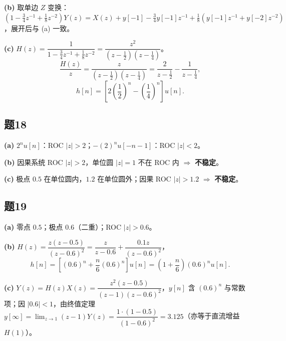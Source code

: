 \documentclass[11pt,a4paper]{ctexart}
\begin{document}
\textbf{(b)} 取单边 $Z$ 变换：$(1-\frac{3}{4}z^{-1}+\frac{1}{8}z^{-2})Y(z)=X(z)+y[-1]-\frac{3}{4}y[-1]z^{-1}+\frac{1}{8}(y[-1]z^{-1}+y[-2]z^{-2})$，展开后与 (a) 一致。

\textbf{(c)} $H(z)=\dfrac{1}{1-\frac{3}{4}z^{-1}+\frac{1}{8}z^{-2}}=\dfrac{z^2}{(z-\frac{1}{2})(z-\frac{1}{4})}$。
\[
\frac{H(z)}{z}=\frac{z}{(z-\frac{1}{2})(z-\frac{1}{4})}=\frac{2}{z-\frac{1}{2}}-\frac{1}{z-\frac{1}{4}},
\]
\[
h[n]=\left[2\left(\frac{1}{2}\right)^n-\left(\frac{1}{4}\right)^n\right]u[n].
\]

\subsection*{题18}

\textbf{(a)} $2^n u[n]$：ROC $|z|>2$；$-(2)^n u[-n-1]$：ROC $|z|<2$。

\textbf{(b)} 因果系统 ROC $|z|>2$，单位圆 $|z|=1$ 不在 ROC 内 $\Rightarrow$ \textbf{不稳定}。

\textbf{(c)} 极点 $0.5$ 在单位圆内，$1.2$ 在单位圆外；因果 ROC $|z|>1.2$ $\Rightarrow$ \textbf{不稳定}。

\begin{figure}[htbp]
\centering
{}
\end{figure}

\subsection*{题19}

\textbf{(a)} 零点 $0.5$；极点 $0.6$（二重）；ROC $|z|>0.6$。

\textbf{(b)} $H(z)=\dfrac{z(z-0.5)}{(z-0.6)^2}=\dfrac{z}{z-0.6}+\dfrac{0.1z}{(z-0.6)^2}$，
\[
h[n]=\left[(0.6)^n+\frac{n}{6}(0.6)^n\right]u[n]=\left(1+\frac{n}{6}\right)(0.6)^n u[n].
\]

\textbf{(c)} $Y(z)=H(z)X(z)=\dfrac{z^2(z-0.5)}{(z-1)(z-0.6)^2}$，$y[n]$ 含 $(0.6)^n$ 与常数项；因 $|0.6|<1$，由终值定理
$y[\infty]=\lim_{z\to1}(z-1)Y(z)=\dfrac{1\cdot(1-0.5)}{(1-0.6)^2}=3.125$（亦等于直流增益 $H(1)$）。
\end{document}
